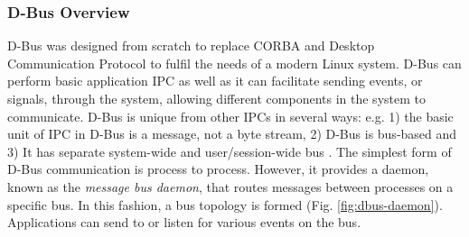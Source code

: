 \subsubsection*{D-Bus Overview}
D-Bus was designed from scratch to replace CORBA and Desktop Communication Protocol to fulfil the needs of a modern Linux system. D-Bus can perform basic application IPC as well as it can facilitate sending events, or signals, through the system, allowing different components in the system to communicate. D-Bus is unique from other IPCs in several ways: e.g. 1) the basic unit of IPC in D-Bus is a message, not a byte stream, 2) D-Bus is bus-based and 3) It has separate system-wide and user/session-wide bus \cite{Love2005}. The simplest form of D-Bus communication is process to process. However, it provides a daemon, known as the {\em message bus daemon}, that routes messages between processes on a specific bus. In this fashion, a bus topology is formed (Fig. \ref{fig:dbus-daemon}). Applications can send to or listen for various events on the bus.

